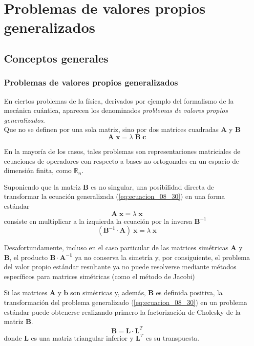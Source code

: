 \section{Problemas de valores propios generalizados}
\subsection{Conceptos generales}
\begin{frame}
\frametitle{{Problemas de valores propios generalizados}}
En ciertos problemas de la física, derivados por ejemplo del formalismo de la mecánica cuántica, aparecen los denominados \emph{problemas de valores propios generalizados}.
\\
\bigskip
Que no se definen por una sola matriz, sino por dos matrices cuadradas $\mathbf{A}$ y $\mathbf{B}$
\begin{equation}
\mathbf{A} \; \mathbf{x} =  \lambda \; \mathbf{B} \; \mathbf{c}
\label{eq:ecuacion_08_30}
\end{equation}
\end{frame}
\begin{frame}
En la mayoría de los casos, tales problemas son representaciones matriciales de ecuaciones de operadores con respecto a bases no ortogonales en un espacio de dimensión finita, como $\mathbb{R}_{n}$.
\end{frame}
\begin{frame}
Suponiendo que la matriz $\mathbf{B}$ es no singular, una posibilidad directa de transformar la ecuación generalizada (\ref{eq:ecuacion_08_30}) en una forma estándar
\[ \mathbf{A} \; \mathbf{x} = \lambda \; \mathbf{x} \]
consiste en multiplicar a la izquierda la ecuación por la inversa $\mathbf{B}^{-1}$
\[ ( \mathbf{B}^{-1} \cdot \mathbf{A}) \; \mathbf{x} = \lambda \; \mathbf{x} \]
\end{frame}
\begin{frame}
Desafortundamente, incluso en el caso particular de las matrices simétricas $\mathbf{A}$ y $\mathbf{B}$, el producto $\mathbf{B \cdot A^{-1}}$ ya no conserva la simetría y, por consiguiente, el problema del valor propio estándar resultante ya no puede resolverse mediante métodos específicos para matrices simétricas (como el método de Jacobi)
\end{frame}
\begin{frame}
Si las matrices $\mathbf{A}$ y $\mathbf{b}$ son simétricas y, además, $\mathbf{B}$ es definida positiva, la transformación del problema generalizado (\ref{eq:ecuacion_08_30}) en un problema estándar puede obtenerse realizando primero la factorización de Cholesky de la matriz $\mathbf{B}$.
\begin{equation}
\mathbf{B} =  \mathbf{L} \cdot \mathbf{L}^{T}
\label{eq:ecuacion_08_31}
\end{equation}
donde $\mathbf{L}$ es una matriz triangular inferior y $\mathbf{L}^{T}$ es su transpuesta.
\end{frame}
